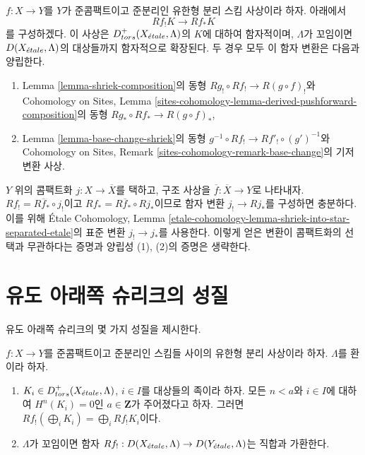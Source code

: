 \begin{remark}
\label{remark-shriek-to-star}
$f : X \to Y$를 $Y$가 준콤팩트이고 준분리인 유한형 분리 스킴
사상이라 하자. 아래에서
$$
Rf_!K \longrightarrow Rf_*K
$$
를 구성하겠다. 이 사상은
$D^+_{tors}(X_{\acute{e}tale}, \Lambda)$의 $K$에 대하여 함자적이며,
$\Lambda$가 꼬임이면 $D(X_{\acute{e}tale}, \Lambda)$의 대상들까지 함자적으로
확장된다. 두 경우 모두 이 함자 변환은 다음과 양립한다.
\begin{enumerate}
\item Lemma \ref{lemma-shriek-composition}의 동형
$Rg_! \circ Rf_! \to R(g \circ f)_!$와 Cohomology on Sites,
Lemma \ref{sites-cohomology-lemma-derived-pushforward-composition}의
동형 $Rg_* \circ Rf_* \to R(g \circ f)_*$,
\item Lemma \ref{lemma-base-change-shriek}의 동형
$g^{-1} \circ Rf_! \to Rf'_! \circ (g')^{-1}$와
Cohomology on Sites, Remark
\ref{sites-cohomology-remark-base-change}의 기저변환 사상.
\end{enumerate}
$Y$ 위의 콤팩트화 $j : X \to \overline{X}$를 택하고,
구조 사상을 $\overline{f} : \overline{X} \to Y$로 나타내자.
$Rf_! = R\overline{f}_* \circ j_!$이고
$Rf_* = R\overline{f}_* \circ Rj_*$이므로 함자 변환
$j_! \to Rj_*$를 구성하면 충분하다. 이를 위해 \'Etale Cohomology,
Lemma \ref{etale-cohomology-lemma-shriek-into-star-separated-etale}의
표준 변환 $j_! \to j_*$를 사용한다. 이렇게 얻은 변환이 콤팩트화의
선택과 무관하다는 증명과 양립성 (1), (2)의 증명은 생략한다.
\end{remark}


\section{유도 아래쪽 슈리크의 성질}
\label{section-derived-lower-shriek-properties}

\noindent
유도 아래쪽 슈리크의 몇 가지 성질을 제시한다.

\begin{lemma}
\label{lemma-derived-lower-shriek-commute-direct-sums}
$f : X \to Y$를 준콤팩트이고 준분리인 스킴들 사이의 유한형 분리
사상이라 하자. $\Lambda$를 환이라 하자.
\begin{enumerate}
\item $K_i \in D^+_{tors}(X_{\acute{e}tale}, \Lambda)$, $i \in I$를 대상들의
족이라 하자. 모든 $n < a$와 $i \in I$에 대하여
$H^n(K_i) = 0$인 $a \in \mathbf{Z}$가 주어졌다고 하자.
그러면 $Rf_!(\bigoplus_i K_i) =
\bigoplus_i Rf_!K_i$이다.
\item $\Lambda$가 꼬임이면 함자
$Rf_! : D(X_{\acute{e}tale}, \Lambda) \to D(Y_{\acute{e}tale}, \Lambda)$는
직합과 가환한다.
\end{enumerate}
\end{lemma}

